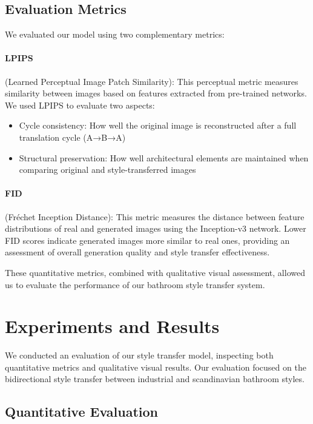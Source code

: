 \documentclass[twocolumn,superscriptaddress,aps]{revtex4-1}
\begin{document}
\subsection{Evaluation Metrics}

We evaluated our model using two complementary metrics:

\paragraph{LPIPS} (Learned Perceptual Image Patch Similarity): This perceptual metric measures similarity between images based on features extracted from pre-trained networks. We used LPIPS to evaluate two aspects:
    \begin{itemize}
        \item Cycle consistency: How well the original image is reconstructed after a full translation cycle (A→B→A)
        \item Structural preservation: How well architectural elements are maintained when comparing original and style-transferred images
    \end{itemize}
\paragraph{FID} (Fréchet Inception Distance): This metric measures the distance between feature distributions of real and generated images using the Inception-v3 network. Lower FID scores indicate generated images more similar to real ones, providing an assessment of overall generation quality and style transfer effectiveness.

These quantitative metrics, combined with qualitative visual assessment, allowed us to evaluate the performance of our bathroom style transfer system.

\section{Experiments and Results}

We conducted an evaluation of our style transfer model, inspecting both quantitative metrics and qualitative visual results. Our evaluation focused on the bidirectional style transfer between industrial and scandinavian bathroom styles.

\subsection{Quantitative Evaluation}
\end{document}
